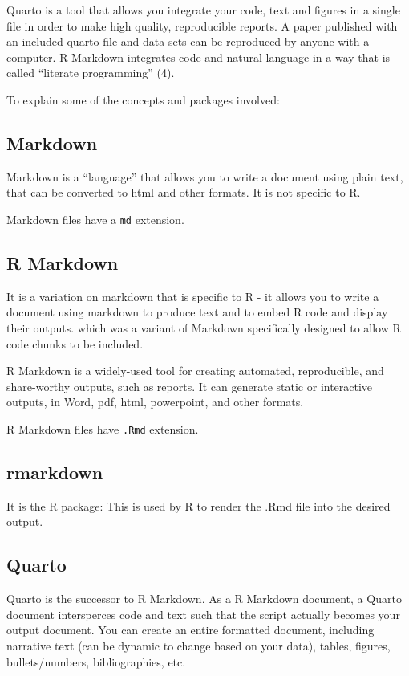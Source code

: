 \documentclass[
  letterpaper,
  DIV=11,
  numbers=noendperiod,
  oneside]{scrreprt}
\begin{document}
Quarto is a tool that allows you integrate your code, text and figures
in a single file in order to make high quality, reproducible reports. A
paper published with an included quarto file and data sets can be
reproduced by anyone with a computer. R Markdown integrates code and
natural language in a way that is called ``literate programming'' (4).

To explain some of the concepts and packages involved:

\subsection{Markdown}

Markdown is a ``language'' that allows you to write a document using
plain text, that can be converted to html and other formats. It is not
specific to R.

Markdown files have a \texttt{md} extension.

\subsection{R Markdown}

It is a variation on markdown that is specific to R - it allows you to
write a document using markdown to produce text and to embed R code and
display their outputs. which was a variant of Markdown specifically
designed to allow R code chunks to be included.

R Markdown is a widely-used tool for creating automated, reproducible,
and share-worthy outputs, such as reports. It can generate static or
interactive outputs, in Word, pdf, html, powerpoint, and other formats.

R Markdown files have \texttt{.Rmd} extension.

\subsection{rmarkdown}

It is the R package: This is used by R to render the .Rmd file into the
desired output.

\subsection{Quarto}

Quarto is the successor to R Markdown. As a R Markdown document, a
Quarto document intersperces code and text such that the script actually
becomes your output document. You can create an entire formatted
document, including narrative text (can be dynamic to change based on
your data), tables, figures, bullets/numbers, bibliographies, etc.
\end{document}
